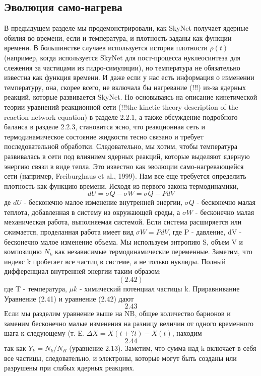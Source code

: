 \documentclass[%
bachelor,    %
natbib,      %
subf,        %
href,        %
colorlinks,  %
]{disser}
\begin{document}
\subsection{Эволюция само-нагрева}
В предыдущем разделе мы продемонстрировали, как SkyNet получает ядерные обилия во времени, если и температура, и плотность заданы как функции времени. В большинстве случаев используется история плотности $\rho(t)$ (например, когда используется SkyNet для пост-процесса нуклеосинтеза для слежения за частицами из гидро-симуляции), но температура не обязательно известна как функция времени. И даже если у нас есть информация о изменении температуру, она, скорее всего, не включала бы нагревание (!!!) из-за ядерных реакций, которые развивается SkyNet. Но основываясь на описание кинетической теории уравнений реакционной сети (!!!the kinetic theory description of the reaction network equation) в разделе 2.2.1, а также обсуждение подробного баланса в разделе 2.2.3, становится ясно, что реакционная сеть и термодинамическое состояние жидкости тесно связано и требует последовательной обработки. Следовательно, мы хотим, чтобы температура развивалась в сети под влиянием ядерных реакций, которые выделяют ядерную энергию связи в виде тепла. Это известно как эволюции само-нагревающейся сети (например, Freiburghaus et al., 1999). Нам все еще требуется определить плотность как функцию времени.
Исходя из первого закона термодинамики,
$$
dU = \sigma Q - \sigma W = \sigma Q - P dV
$$
де $dU$ - бесконечно малое изменение внутренней энергии, $\sigma Q$ - бесконечно малая теплота, добавленная в систему из окружающей среды, а $\sigma W$ - бесконечно малая механическая работа, выполняемая системой. Если система расширяется или сжимается, проделанная работа имеет вид $\sigma W = PdV$, где P - давление, dV - бесконечно малое изменение объема. Мы используем энтропию S, объем V и композицию ${N_k}$ как независимые термодинамические переменные. Заметим, что индекс k пробегает все частиц в системе, а не только нуклиды. Полный дифференциал внутренней энергии таким образом:
$$(2.42)$$
где T - температура, $\mu k$ - химический потенциал частицы k. Приравнивание
Уравнение (2.41) и уравнение (2.42) дают
$$2.43$$
Если мы разделим уравнение выше на NB, общее количество барионов и заменим бесконечно малые изменения на разницу величин от одного временного шага к следующему (т. Е.
$\Delta X = X(t + ?t) - X(t)$, находим
$$2.44$$
так как $Y_k = N_k / N_B$ (уравнение 2.13). Заметим, что сумма над k включает в себя все частицы,
следовательно, и электроны, которые могут быть созданы или разрушены при слабых ядерных реакциях.
\end{document}
